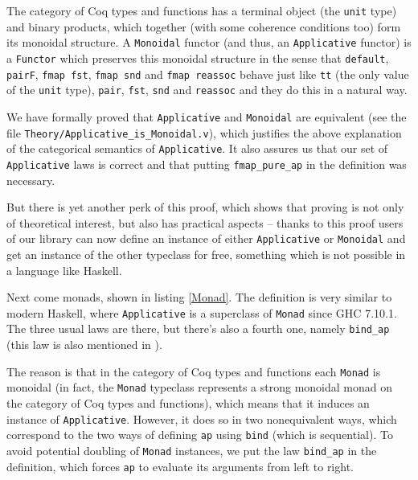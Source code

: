 \documentclass[declaration,inz,english,shortabstract]{iithesis}
\newcommand{\m}[1]{\texttt{#1}}
\begin{document}
The category of Coq types and functions has a terminal object (the \m{unit} type) and binary products, which together (with some coherence conditions too) form its monoidal structure. A \m{Monoidal} functor (and thus, an \m{Applicative} functor) is a \m{Functor} which preserves this monoidal structure in the sense that \m{default}, \m{pairF}, \m{fmap fst}, \m{fmap snd} and \m{fmap reassoc} behave just like \m{tt} (the only value of the \m{unit} type), \m{pair}, \m{fst}, \m{snd} and \m{reassoc} and they do this in a natural way.

We have formally proved that \m{Applicative} and \m{Monoidal} are equivalent (see the file \m{Theory/Applicative\_is\_Monoidal.v}), which justifies the above explanation of the categorical semantics of \m{Applicative}. It also assures us that our set of \m{Applicative} laws is correct and that putting \m{fmap\_pure\_ap} in the definition was necessary.

But there is yet another perk of this proof, which shows that proving is not only of theoretical interest, but also has practical aspects -- thanks to this proof users of our library can now define an instance of either \m{Applicative} or \m{Monoidal} and get an instance of the other typeclass for free, something which is not possible in a language like Haskell.


Next come monads, shown in listing \ref{Monad}. The definition is very similar to modern Haskell, where \m{Applicative} is a superclass of \m{Monad} since GHC 7.10.1. The three usual laws are there, but there's also a fourth one, namely \m{bind\_ap} (this law is also mentioned in \cite{HackageMonad}).

The reason is that in the category of Coq types and functions each \m{Monad} is monoidal (in fact, the \m{Monad} typeclass represents a strong monoidal monad on the category of Coq types and functions), which means that it induces an instance of \m{Applicative}. However, it does so in two nonequivalent ways, which correspond to the two ways of defining \m{ap} using \m{bind} (which is sequential). To avoid potential doubling of \m{Monad} instances, we put the law \m{bind\_ap} in the definition, which forces \m{ap} to evaluate its arguments from left to right.
\end{document}
